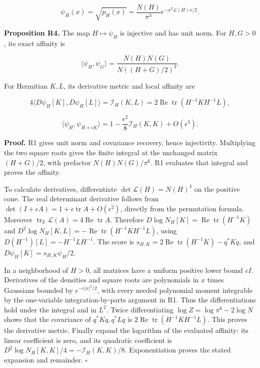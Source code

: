 \documentclass[
  11pt,
]{article}
\begin{document}
\[
\psi_H(x)=\sqrt{p_H(x)}=\frac{N(H)}{\pi^3}
             e^{-x^T\mathscr L(H)x/2}.
\]

\textbf{Proposition R4.} The map \(H\mapsto\psi_H\) is injective and has
unit norm. For \(H,G>0\), its exact affinity is

\[
\langle\psi_H,\psi_G\rangle
=\frac{N(H)N(G)}{N((H+G)/2)^2}.
\]

For Hermitian \(K,L\), its derivative metric and local affinity are

\[
4\langle D\psi_H[K],D\psi_H[L]\rangle
=\mathcal I_H(K,L)=2\operatorname{Re}\operatorname{tr}(H^{-1}KH^{-1}L),
\]

\[
\langle\psi_H,\psi_{H+\epsilon K}\rangle
=1-\frac{\epsilon^2}{8}\mathcal I_H(K,K)+O(\epsilon^3).
\]

\textbf{Proof.} R1 gives unit norm and covariance recovery, hence
injectivity. Multiplying the two square roots gives the finite integral
at the unchanged matrix \((H+G)/2\), with prefactor \(N(H)N(G)/\pi^6\).
R1 evaluates that integral and proves the affinity.

To calculate derivatives, differentiate \(\det\mathscr L(H)=N(H)^4\) on
the positive cone. The real determinant derivative follows from
\(\det(I+\epsilon A)=1+\epsilon\operatorname{tr}A+O(\epsilon^2)\),
directly from the permutation formula. Moreover
\(\operatorname{tr}_{\mathbb R}\mathscr L(A)=4\operatorname{Re}\operatorname{tr}A\).
Therefore \(D\log N_H[K]=\operatorname{Re}\operatorname{tr}(H^{-1}K)\)
and
\(D^2\log N_H[K,L]=-\operatorname{Re}\operatorname{tr}(H^{-1}KH^{-1}L)\),
using \(D(H^{-1})[L]=-H^{-1}LH^{-1}\). The score is
\(s_{H,K}=2\operatorname{Re}\operatorname{tr}(H^{-1}K)-q^*Kq\), and
\(D\psi_H[K]=s_{H,K}\psi_H/2\).

In a neighborhood of \(H>0\), all matrices have a uniform positive lower
bound \(cI\). Derivatives of the densities and square roots are
polynomials in \(x\) times Gaussians bounded by \(e^{-c|x|^2/2}\), with
every needed polynomial moment integrable by the one-variable
integration-by-parts argument in R1. Thus the differentiations hold
under the integral and in \(L^2\). Twice differentiating
\(\log Z=\log\pi^6-2\log N\) shows that the covariance of
\(q^*Kq,q^*Lq\) is
\(2\operatorname{Re}\operatorname{tr}(H^{-1}KH^{-1}L)\). This proves the
derivative metric. Finally expand the logarithm of the evaluated
affinity: its linear coefficient is zero, and its quadratic coefficient
is \(D^2\log N_H[K,K]/4=-\mathcal I_H(K,K)/8\). Exponentiation proves
the stated expansion and remainder. \ensuremath{\square}
\end{document}
